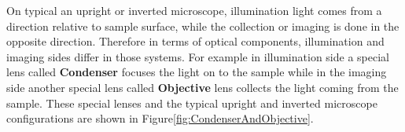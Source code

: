 On typical an upright or inverted microscope, illumination light comes from a direction 
relative to sample surface, while the collection or imaging is done in the opposite direction. 
Therefore in terms of optical components, illumination and imaging sides differ in those
systems. For example in illumination side a special lens called \textbf{Condenser} focuses
the light on to the sample while in the imaging side another special lens called \textbf{
Objective} lens collects the light coming from the sample. These special lenses and the
typical upright and inverted microscope configurations are shown in Figure\ref{fig:CondenserAndObjective}.

%
%
%
